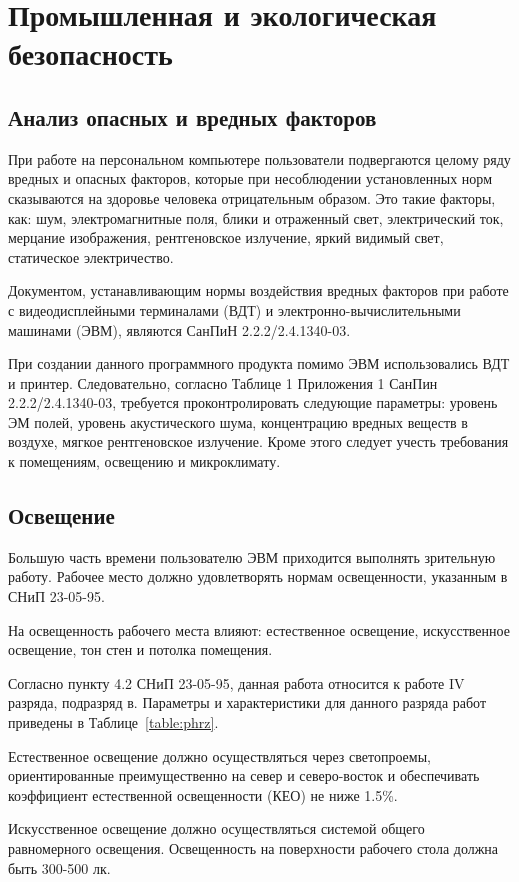 \chapter{Промышленная и экологическая безопасность}

\section{Анализ опасных и вредных факторов}
При работе на персональном компьютере пользователи подвергаются целому ряду вредных и опасных факторов, которые при несоблюдении установленных норм сказываются на здоровье человека отрицательным образом. Это такие факторы, как: шум, электромагнитные поля, блики и отраженный свет, электрический ток, мерцание изображения, рентгеновское излучение, яркий видимый свет, статическое электричество.

Документом, устанавливающим нормы воздействия вредных факторов при работе с видеодисплейными терминалами (ВДТ) и электронно-вычислительными машинами (ЭВМ), являются СанПиН 2.2.2/2.4.1340-03.

При создании данного программного  продукта помимо ЭВМ использовались ВДТ и принтер. Следовательно, согласно Таблице 1 Приложения 1 СанПин 2.2.2/2.4.1340-03, требуется проконтролировать следующие параметры: уровень ЭМ полей, уровень акустического шума, концентрацию вредных веществ в воздухе, мягкое рентгеновское излучение. Кроме этого следует учесть требования к помещениям, освещению и микроклимату.

\section{Освещение}
Большую часть времени пользователю ЭВМ приходится выполнять зрительную работу. Рабочее место должно удовлетворять нормам освещенности, указанным в СНиП 23-05-95.

На освещенность рабочего места влияют: естественное освещение, искусственное освещение, тон стен и потолка помещения.

Согласно пункту 4.2 СНиП 23-05-95, данная работа относится к работе IV разряда, подразряд в. Параметры и характеристики для данного разряда работ приведены в Таблице~\ref{table:phrz}.

Естественное освещение должно осуществляться через светопроемы, ориентированные преимущественно на север и северо-восток и обеспечивать коэффициент естественной освещенности (КЕО) не ниже 1.5\%.

Искусственное освещение должно осуществляться системой общего равномерного освещения. Освещенность на поверхности рабочего стола должна быть 300-500 лк.

